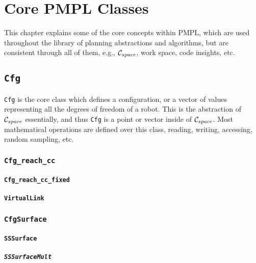 \chapter{Core PMPL Classes}

This chapter explains some of the core concepts within PMPL, which are used
throughout the library of planning abstractions and algorithms, but are
consistent through all of them, e.g., $\mathcal{C}_{space}$, work space, code insights, etc.

\section{\texttt{Cfg}}

\texttt{Cfg} is the core class which defines a configuration, or a vector of
values representing all the degrees of freedom of a robot. This is the
abstraction of $\mathcal{C}_{space}$ essentially, and thus \texttt{Cfg} is a point or vector
inside of $\mathcal{C}_{space}$. Most mathematical operations are defined over this class,
reading, writing, accessing, random sampling, etc.

\subsection{\texttt{Cfg\_reach\_cc}}

\subsubsection{\texttt{Cfg\_reach\_cc\_fixed}}

\subsubsection{\texttt{VirtualLink}}

\subsection{\texttt{CfgSurface}}

\subsubsection{\texttt{SSSurface}}

\paragraph{\texttt{SSSurfaceMult}}

